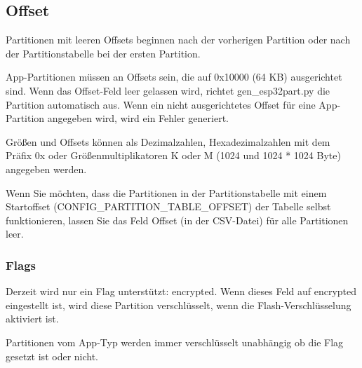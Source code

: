 \subsection{Offset}
Partitionen mit leeren Offsets beginnen nach der vorherigen Partition oder nach der Partitionstabelle bei der ersten Partition.

App-Partitionen müssen an Offsets sein, die auf 0x10000 (64 KB) ausgerichtet sind. Wenn das Offset-Feld leer gelassen wird, richtet gen\_esp32part.py die Partition automatisch aus. Wenn ein nicht ausgerichtetes Offset für eine App-Partition angegeben wird, wird ein Fehler generiert.

Größen und Offsets können als Dezimalzahlen, Hexadezimalzahlen mit dem Präfix 0x oder Größenmultiplikatoren K oder M (1024 und 1024 * 1024 Byte) angegeben werden.

Wenn Sie möchten, dass die Partitionen in der Partitionstabelle mit einem Startoffset (CONFIG\_PARTITION\_TABLE\_OFFSET) der Tabelle selbst funktionieren, lassen Sie das Feld Offset (in der CSV-Datei) für alle Partitionen leer.

\subsubsection{Flags}
Derzeit wird nur ein Flag unterstützt: encrypted. Wenn dieses Feld auf encrypted eingestellt ist, wird diese Partition verschlüsselt, wenn die Flash-Verschlüsselung aktiviert ist.

Partitionen vom App-Typ werden immer verschlüsselt unabhängig ob die Flag gesetzt ist oder nicht.\cite{espressif_partition_tables}

